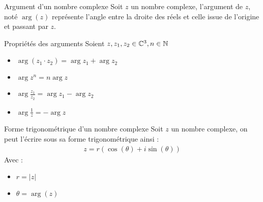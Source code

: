 \begin{definition}{Argument d'un nombre complexe}
    Soit $z$ un nombre complexe, l'argument de $z$, noté $\arg{(z)}$ représente l'angle entre la droite des réels et celle issue de l'origine et passant par $z$.
\end{definition}

\begin{proposition}{Propriétés des arguments}
    Soient $z, z_1, z_2 \in \mathbb{C}^3, n \in \mathbb{N}$
    \begin{itemize}
        \item $\arg{(z_1 \cdot z_2)} = \arg{z_1} + \arg{z_2}$
        \item $\arg{z^n} = n\arg{z}$
        \item $\arg{\frac{z_1}{z_2}} = \arg{z_1} - \arg{z_2}$
        \item $\arg{\frac{1}{z}} = -\arg{z}$
    \end{itemize}
\end{proposition}

\begin{definition}{Forme trigonométrique d'un nombre complexe}
    Soit $z$ un nombre complexe, on peut l'écrire sous sa forme trigonométrique ainsi :
    \begin{align*}
        z = r (\cos{(\theta)} + i \sin{(\theta)})
    \end{align*}
    Avec :
    \begin{itemize}
        \item $r = |z|$
        \item $\theta = \arg{(z)}$
    \end{itemize}
\end{definition}

